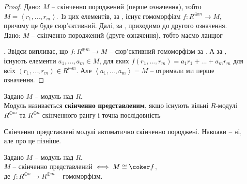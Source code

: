 \documentclass{math_library}
\begin{document}
\begin{proof}
\rightproof Дано: $M$ -- скінченно породжений (перше означення), тобто $M = \left< r_1,\dots,r_m\right>$. Із цих елементів, за , існує гомоморфізм $f \colon R^{\oplus m} \to M$, причому це буде сюр'єктивний. Далі, за , приходимо до другого означення.
\bigskip \\
\leftproof Дано: $M$ -- скінченно породжений (друге означення), тобто маємо ланцюг . Звідси випливає, що $f \colon R^{\oplus m} \to M$ -- сюр'єктивний гомоморфізм за . А за , існують елементи $a_1,\dots,a_m \in M$, для яких $f(r_1,\dots,r_m) = a_1r_1+\dots+a_mr_m$ для всіх $(r_1,\dots,r_m) \in R^{\oplus m}$. Але $\left< a_1,\dots,a_m \right> = M$ -- отримали ми перше означення.
\end{proof}

\begin{definition}
Задано $M$ -- модуль над $R$.\\
Модуль називається \textbf{скінченно представленим}, якщо існують вільні $R$-модулі $R^{\oplus m}$ та $R^{\oplus n}$ скінченного рангу і точна послідовність
\begin{figure}[H]
\centering
{}
\end{figure}
\end{definition}

\begin{remark}
Скінченно представлені модулі автоматично скінченно породжені. Навпаки -- ні, але про це пізніше.
\end{remark}

\begin{proposition}
Задано $M$ -- модуль над $R$.\\
$M$ -- скінченно представлений $\iff M \cong \coker f$, \\
де $f \colon R^{\oplus n} \to R^{\oplus m}$ -- гомоморфізм.
\end{proposition}
\end{document}
